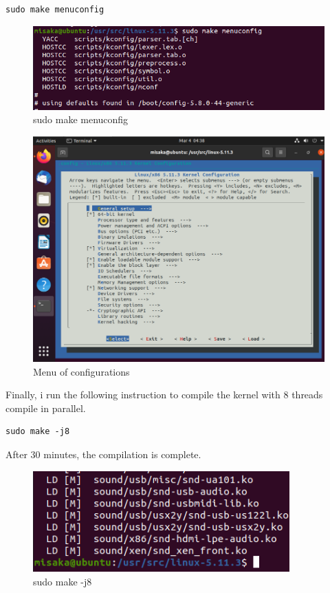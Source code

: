 \documentclass[UTF8,10pt,a4paper]{article}
\theoremstyle{Problem}
\theoremstyle{Solution}
\begin{document}
\begin{lstlisting}
sudo make menuconfig
\end{lstlisting}

\begin{figure}[H]
    \centering
    \includegraphics[width=380pt]{7.png}
    \caption{sudo make menuconfig}
    \label{7}
\end{figure}

\begin{figure}[H]
    \centering
    \includegraphics[width=380pt]{6.png}
    \caption{Menu of configurations}
    \label{6}
\end{figure}

Finally, i run the following instruction to compile the kernel with 8 threads compile in parallel.

\begin{lstlisting}
sudo make -j8
\end{lstlisting}

After 30 minutes, the compilation is complete.

\begin{figure}[H]
    \centering
    \includegraphics[width=280pt]{9.png}
    \caption{sudo make -j8}
    \label{9}
\end{figure}
\end{document}
